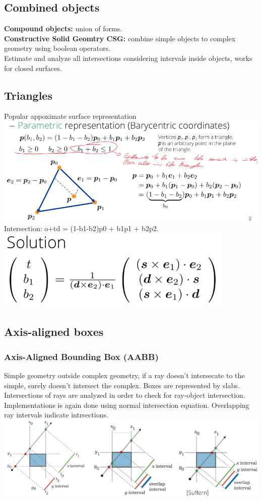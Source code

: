 \documentclass{article}
\begin{document}
\subsection{Combined objects}
\textbf{Compound objects: }union of forms.\\
\textbf{Constructive Solid Geomtry CSG: }combine simple objects to complex geometry using boolean operators.\\
Estimate and analyze all intersections considering intervals inside objects, works for closed surfaces.
\subsection{Triangles}
Popular appoximate surface representation
\includegraphics{image10.png}
Intersection: o+td = (1-b1-b2)p0 + b1p1 + b2p2. \\
\includegraphics{image11.png}
\subsection{Axis-aligned boxes}
\subsubsection{Axis-Aligned Bounding Box (AABB)}
Simple geometry outside complex geometry, if a ray doesn't intersecate to the simple, surely doesn't intersect the complex. Boxes are represented by slabs. Intersections of rays are analyzed in order to check for ray-object intersection.
Implementations is again done using normal intersection equation.
Overlapping ray intervals indicate intrsections.\\
\includegraphics{image12.png}
\end{document}
